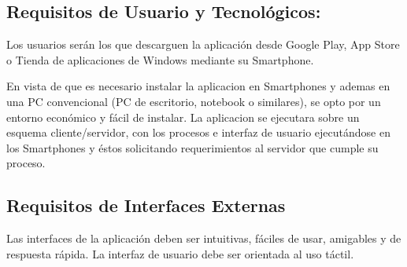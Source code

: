     \subsection{Requisitos de Usuario y Tecnológicos:}


    Los usuarios serán los que descarguen la aplicación desde Google Play, App Store o Tienda de aplicaciones de Windows mediante su Smartphone.


    En vista de que es necesario instalar la aplicacion en Smartphones y ademas en una PC convencional (PC de escritorio, notebook o similares), se opto por un entorno económico y fácil de instalar. La aplicacion se ejecutara sobre un esquema cliente/servidor, con los procesos e interfaz de usuario ejecutándose en los Smartphones y éstos solicitando requerimientos al servidor que cumple su proceso.

    \subsection{Requisitos de Interfaces Externas}


    Las interfaces de la aplicación deben ser intuitivas, fáciles de usar, amigables y de respuesta rápida. La interfaz de usuario debe ser orientada al uso táctil.


